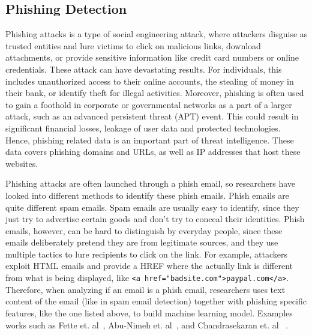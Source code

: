 \subsection{Phishing Detection}
Phishing attacks is a type of social engineering attack, where attackers 
disguise as trusted entities and lure victims to click on malicious links, 
download attachments, or provide sensitive information like credit card
numbers or online credentials. These attack can have devastating results. 
For individuals, this includes unauthorized access to their online 
accounts, the stealing of money in their bank, or identify theft for illegal
activities. Moreover, phishing is often used to gain a foothold in corporate 
or governmental networks as a part of a larger attack, such as an 
advanced persistent threat (APT) event. This could result in significant
financial losses, leakage of user data and protected technologies. Hence,
phishing related data is an important part of threat intelligence. These data
covers phishing domains and URLs, as well as IP addresses that host these
websites. 

Phishing attacks are often launched through a phish email, so researchers
have looked into different methods to identify these phish emails. Phish emails
are quite different spam emails. Spam emails are usually easy to identify,
since they just try to advertise certain goods and don't try to conceal 
their identities. Phish emails, however, can be hard to distinguish by 
everyday people, since these emails deliberately pretend they are
from legitimate sources, and they use multiple tactics to lure recipients
to click on the link. For example, attackers exploit HTML emails and
provide a HREF where the actually link is different from what is being 
displayed, like \texttt{<a href="badsite.com">paypal.com</a>}. Therefore,
when analyzing if an email is a phish email, researchers uses text content
of the email (like in spam email detection) together with phishing specific 
features, like the one listed above, to build machine learning model. 
Examples works such as Fette et. al~\cite{fette2007learning}, Abu-Nimeh 
et. al~\cite{abu2007comparison}, and Chandrasekaran et. al
~\cite{chandrasekaran2006phishing}.

